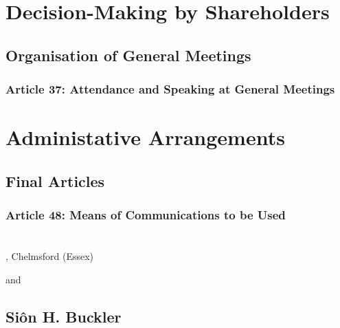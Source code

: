\documentclass[letterpaper,10pt,english]{sphinxmanual}
\begin{document}
\chapter{Decision-Making by Shareholders}
\label{\detokenize{decisionmaking:decision-making-by-shareholders}}\label{\detokenize{decisionmaking::doc}}

\section{Organisation of General Meetings}
\label{\detokenize{decisionmaking:organisation-of-general-meetings}}

\subsection{Article 37: Attendance and Speaking at General Meetings}
\label{\detokenize{decisionmaking:article-37-attendance-and-speaking-at-general-meetings}}

\chapter{Administative Arrangements}
\label{\detokenize{administrativearrangements:administative-arrangements}}\label{\detokenize{administrativearrangements::doc}}

\section{Final Articles}
\label{\detokenize{administrativearrangements:final-articles}}

\subsection{Article 48: Means of Communications to be Used}
\label{\detokenize{administrativearrangements:article-48-means-of-communications-to-be-used}}

\chapter{}
\label{\detokenize{index:document-author-s}}
, Chelmsford (Essex)

and


\section{Siôn H. Buckler}
\label{\detokenize{index:sion-h-buckler}}
\end{document}
